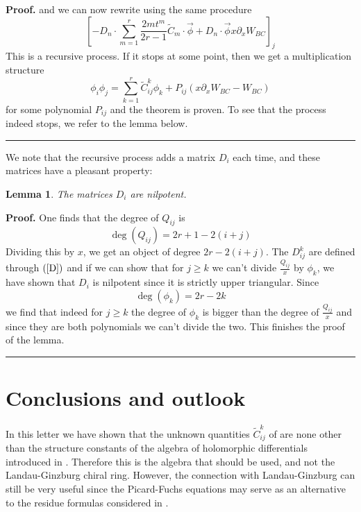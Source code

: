 \documentclass[a4paper,11pt]{article}
\newtheorem{lemma}[theorem]{Lemma}
\newenvironment{proof}[1][Proof]{\textbf{#1.} }{\ \rule{0.5em}{0.5em}}
\numberwithin{equation}{section}
\begin{document}
\begin{proof}
and we can now rewrite using the same procedure
\begin{equation}
\left[ -D_{n}\cdot \sum_{m=1}^{r}\frac{2mt^{m}}{2r-1}\widetilde{C}_{m}\cdot 
\overrightarrow{\phi }+D_{n}\cdot \overrightarrow{\phi }x\partial _{x}W_{BC}%
\right] _{j}
\end{equation}
This is a recursive process. If it stops at some point, then we get a
multiplication structure 
\begin{equation}
\phi _{i}\phi _{j}=\sum_{k=1}^{r}\widetilde{C}_{ij}^{k}\phi
_{k}+P_{ij}\left( x\partial _{x}W_{BC}-W_{BC}\right) 
\label{we willen deze algebra}
\end{equation}
for some polynomial $P_{ij}$ and the theorem is proven. To see that the
process indeed stops, we refer to the lemma below.
\end{proof}

\noindent
We note that the recursive process adds a matrix $D_{i}
$ each time, and these matrices have a pleasant property:
\begin{lemma}
The matrices $D_{i}$ are nilpotent.
\end{lemma}

\begin{proof}
One finds \cite{ITO-YANG:1998} that the degree of $Q_{ij}$ is 
\begin{equation}
\deg \left( Q_{ij}\right) =2r+1-2\left( i+j\right) 
\end{equation}
Dividing this by $x$, we get an object of degree $2r-2\left( i+j\right) $.
The $D_{ij}^{k}$ are defined through $\left( \ref{D}\right) \ $and if we can
show that for $j\geq k$ we can't divide $\frac{Q_{ij}}{x}$ by $\phi _{k}$,
we have shown that $D_{i}$ is nilpotent since it is strictly upper
triangular. Since 
\begin{equation}
\deg \left( \phi _{k}\right) =2r-2k
\end{equation}
we find that indeed for $j\geq k$ the degree of $\phi _{k}$ is bigger than
the degree of $\frac{Q_{ij}}{x}$ and since they are both polynomials we
can't divide the two. This finishes the proof of the lemma.
\end{proof}

\section{Conclusions and outlook}

In this letter we have shown that the unknown quantities $\tilde{C}_{ij}^{k}$
of \cite{ITO-YANG:1998} are none other than the structure constants of the
algebra of holomorphic differentials introduced in \cite{MARS-MIRO-MORO:2000}%
. Therefore this is the algebra that should be used, and not the
Landau-Ginzburg chiral ring. However, the connection with Landau-Ginzburg
can still be very useful since the Picard-Fuchs equations may serve as an
alternative to the residue formulas considered in \cite{MARS-MIRO-MORO:2000}.

\bigskip



\end{document}
